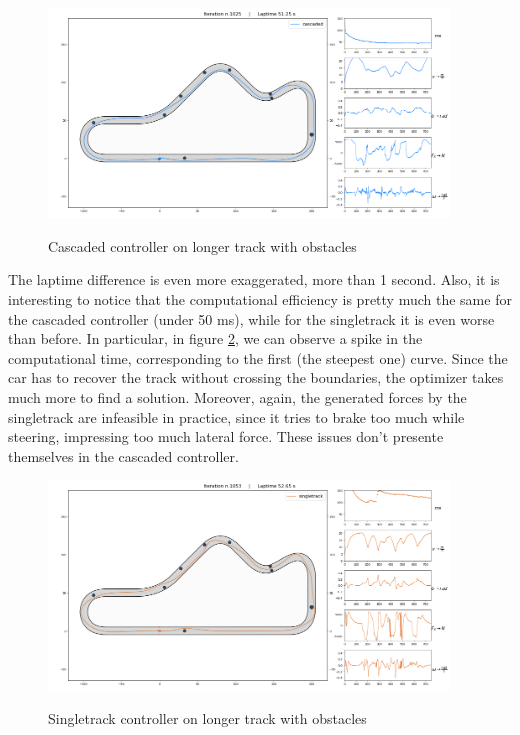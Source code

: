 \documentclass[a4paper, onecolumn, 12pt]{article}
\begin{document}
\begin{figure}[H]
    \centering
    \includegraphics[width=0.95\textwidth]{assets/obstacles_shoe.png}
    \label{shoe}
    \caption{Cascaded controller on longer track with obstacles}
\end{figure}
The laptime difference is even more exaggerated, more than 1 second. Also, it is
interesting to notice that the computational efficiency is pretty much the same
for the cascaded controller (under 50 ms), while for the singletrack it is even
worse than before. In particular, in figure \ref{singletrack_shoe}, we can
observe a spike in the computational time, corresponding to the first (the
steepest one) curve. Since the car has to recover the track without crossing the
boundaries, the optimizer takes much more to find a solution. Moreover, again,
the generated forces by the singletrack are infeasible in practice, since it
tries to brake too much while steering, impressing too much lateral force. These
issues don't presente themselves in the cascaded controller. 
\begin{figure}[H]
    \centering
    \includegraphics[width=0.95\textwidth]{assets/singletrack_obstacles_shoe.png}
    \label{singletrack_shoe}
    \caption{Singletrack controller on longer track with obstacles}
\end{figure}
\end{document}
